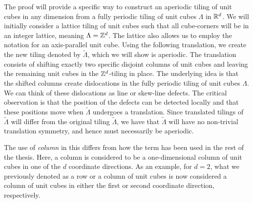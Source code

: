 \documentclass[../thesis.tex]{subfiles}
\begin{document}
The proof will provide a specific way to construct an aperiodic tiling of unit cubes in any dimension from a fully periodic tiling of unit cubes $\Lambda$ in $\mathbb{R}^d$. We will initially consider a lattice tiling of unit cubes such that all cube-corners will be in an integer lattice, meaning $\Lambda = \mathbb{Z}^d$. The lattice also allows us to employ the notation for an axis-parallel unit cube. Using the following translation, we create the new tiling denoted by $\widetilde{\Lambda}$, which we will show is aperiodic. The translation consists of shifting exactly two specific disjoint columns of unit cubes and leaving the remaining unit cubes in the $\mathbb{Z}^d$-tiling in place. The underlying idea is that the shifted columns create dislocations in the fully periodic tiling of unit cubes $\Lambda$. We can think of these dislocations as line or skew-line defects. The critical observation is that the position of the defects can be detected locally and that these positions move when $\widetilde{\Lambda}$ undergoes a translation. Since translated tilings of $\widetilde{\Lambda}$ will differ from the original tiling $\widetilde{\Lambda}$, we have that $\widetilde{\Lambda}$ will have no non-trivial translation symmetry, and hence must necessarily be aperiodic. 

\begin{remark}
    The use of \emph{column} in this  differs from how the term has been used in the rest of the thesis. Here, a column is considered to be a one-dimensional column of unit cubes in one of the $d$ coordinate directions. As an example, for $d=2$, what we previously denoted as a row or a column of unit cubes is now considered a column of unit cubes in either the first or second coordinate direction, respectively.
\end{remark}
\end{document}
